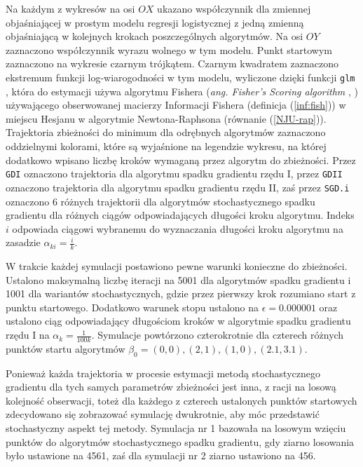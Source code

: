 Na każdym z wykresów na osi $OX$ ukazano współczynnik dla zmiennej objaśniającej w prostym modelu regresji logistycznej z jedną zmienną objaśniającą w kolejnych krokach poszczególnych algorytmów. Na osi $OY$ zaznaczono współczynnik wyrazu wolnego w tym modelu. Punkt startowym zaznaczono na wykresie czarnym trójkątem. Czarnym kwadratem zaznaczono ekstremum funkcji log-wiarogodności w tym modelu, wyliczone dzięki funkcji \texttt{glm} \cite{glmglm}, która do estymacji używa algorytmu Fishera (\textit{ang. Fisher's Scoring algorithm} \cite{scoring1}, \cite{scoring2}) używającego obserwowanej macierzy Informacji Fishera (definicja (\ref{inf:fish})) w miejscu Hesjanu w algorytmie Newtona-Raphsona (równanie (\ref{NJU-rap})). Trajektoria zbieżności do minimum dla odrębnych algorytmów zaznaczono oddzielnymi kolorami, które są wyjaśnione na legendzie wykresu, na której dodatkowo wpisano liczbę kroków wymaganą przez algorytm do zbieżności. Przez \texttt{GDI} oznaczono trajektoria dla algorytmu spadku gradientu rzędu I, przez \texttt{GDII} oznaczono trajektoria dla algorytmu spadku gradientu rzędu II, zaś przez \texttt{SGD.i} oznaczono 6 różnych trajektorii dla algorytmów stochastycznego spadku gradientu dla różnych ciągów odpowiadających długości kroku algorytmu. Indeks $i$ odpowiada ciągowi wybranemu do wyznaczania długości kroku algorytmu na zasadzie $\alpha_{ki} = \frac{i}{k}$.

W trakcie każdej symulacji postawiono pewne warunki konieczne do zbieżności. Ustalono maksymalną liczbę iteracji na 5001 dla algorytmów spadku gradientu i 1001 dla wariantów stochastycznych, gdzie przez pierwszy krok rozumiano start z punktu startowego. Dodatkowo warunek stopu ustalono na $\epsilon=0.000001$ oraz ustalono ciąg odpowiadający długościom kroków w algorytmie spadku gradientu rzędu I na $\alpha_{k} = \frac{1}{100k}$. Symulacje powtórzono czterokrotnie dla czterech różnych punktów startu algorytmów $\beta_0 = (0,0), (2,1), (1,0), (2.1,3.1).$

Ponieważ każda trajektoria w procesie estymacji metodą stochastycznego gradientu dla tych samych parametrów zbieżności jest inna, z racji na losową kolejność obserwacji, toteż dla każdego z czterech ustalonych punktów startowych zdecydowano się zobrazować symulację dwukrotnie, aby móc przedstawić stochastyczny aspekt tej metody. Symulacja nr 1 bazowała na losowym wzięciu punktów do algorytmów stochastycznego spadku gradientu, gdy ziarno losowania było ustawione na 4561, zaś dla symulacji nr 2 ziarno ustawiono na 456.

\newpage

